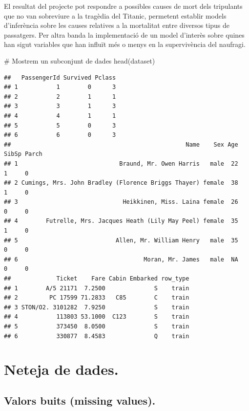 \documentclass[
]{article}
\newenvironment{Shaded}{\begin{snugshade}}{\end{snugshade}}
\newcommand{\CommentTok}[1]{\textcolor[rgb]{0.50,0.62,0.50}{#1}}
\newcommand{\FunctionTok}[1]{\textcolor[rgb]{0.94,0.94,0.56}{#1}}
\newcommand{\NormalTok}[1]{\textcolor[rgb]{0.80,0.80,0.80}{#1}}
\begin{document}
El resultat del projecte pot respondre a possibles causes de mort dels
tripulants que no van sobreviure a la tragèdia del Titanic, permetent
establir models d'inferència sobre les causes relatives a la mortalitat
entre diversos tipus de passatgers. Per altra banda la implementació de
un model d'interès sobre quines han sigut variables que han influït més
o menys en la supervivència del naufragi.

\begin{Shaded}
\begin{Highlighting}[]
\CommentTok{\# Mostrem un subconjunt de dades }
\FunctionTok{head}\NormalTok{(dataset)}
\end{Highlighting}
\end{Shaded}

\begin{verbatim}
##   PassengerId Survived Pclass
## 1           1        0      3
## 2           2        1      1
## 3           3        1      3
## 4           4        1      1
## 5           5        0      3
## 6           6        0      3
##                                                  Name    Sex Age SibSp Parch
## 1                             Braund, Mr. Owen Harris   male  22     1     0
## 2 Cumings, Mrs. John Bradley (Florence Briggs Thayer) female  38     1     0
## 3                              Heikkinen, Miss. Laina female  26     0     0
## 4        Futrelle, Mrs. Jacques Heath (Lily May Peel) female  35     1     0
## 5                            Allen, Mr. William Henry   male  35     0     0
## 6                                    Moran, Mr. James   male  NA     0     0
##             Ticket    Fare Cabin Embarked row_type
## 1        A/5 21171  7.2500              S    train
## 2         PC 17599 71.2833   C85        C    train
## 3 STON/O2. 3101282  7.9250              S    train
## 4           113803 53.1000  C123        S    train
## 5           373450  8.0500              S    train
## 6           330877  8.4583              Q    train
\end{verbatim}

\hypertarget{neteja-de-dades.}{%
\section{Neteja de dades.}\label{neteja-de-dades.}}

\hypertarget{valors-buits-missing-values.}{%
\subsection{Valors buits (missing
values).}\label{valors-buits-missing-values.}}
\end{document}
